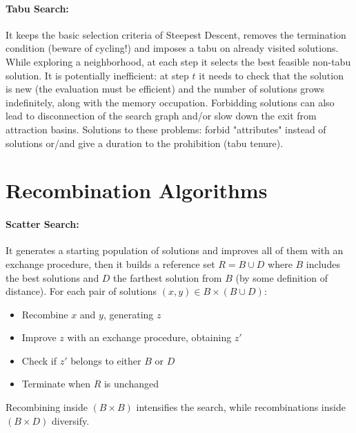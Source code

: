 \documentclass{article}
\begin{document}
	\paragraph{Tabu Search:} It keeps the basic selection criteria of Steepest Descent, removes the termination condition (beware of cycling!) and imposes a tabu on already visited solutions. While exploring a neighborhood, at each step it selects the best feasible non-tabu solution. It is potentially inefficient: at step $t$ it needs to check that the solution is new (the evaluation must be efficient) and the number of solutions grows indefinitely, along with the memory occupation. Forbidding solutions can also lead to disconnection of the search graph and/or slow down the exit from attraction basins. Solutions to these problems: forbid "attributes" instead of solutions or/and give a duration to the prohibition (tabu tenure).\\
	
	\section*{Recombination Algorithms}
	
	\paragraph{Scatter Search:} It generates a starting population of solutions and improves all of them with an exchange procedure, then it builds a reference set $R = B \cup D$ where $B$ includes the best solutions and $D$ the farthest solution from $B$ (by some definition of distance). For each pair of solutions $(x,y) \in B \times (B \cup D)$: 
	\begin{itemize}
		\item Recombine $x$ and $y$, generating $z$
		\item Improve $z$ with an exchange procedure, obtaining $z'$
		\item Check if $z'$ belongs to either $B$ or $D$
		\item Terminate when $R$ is unchanged
	\end{itemize}
	Recombining inside $(B \times B)$ intensifies the search, while recombinations inside $(B \times D)$ diversify.\\
	
\end{document}
